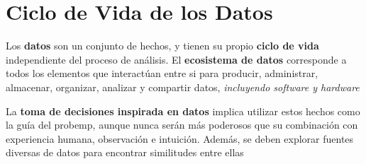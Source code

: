 \section{Ciclo de Vida de los Datos}
Los \textbf{datos} son un conjunto de hechos, y tienen su propio \textbf{ciclo de vida} independiente del proceso de análisis. El \textbf{ecosistema de datos} corresponde a todos los elementos que interactúan entre si para producir, administrar, almacenar, organizar, analizar y compartir datos, \textit{incluyendo software y hardware}

La \textbf{toma de decisiones inspirada en datos} implica utilizar estos hechos como la guía del \gls{probemp}, aunque nunca serán más poderosos que su combinación con experiencia humana, observación e intuición. Además, se deben explorar fuentes diversas de datos para encontrar similitudes entre ellas

